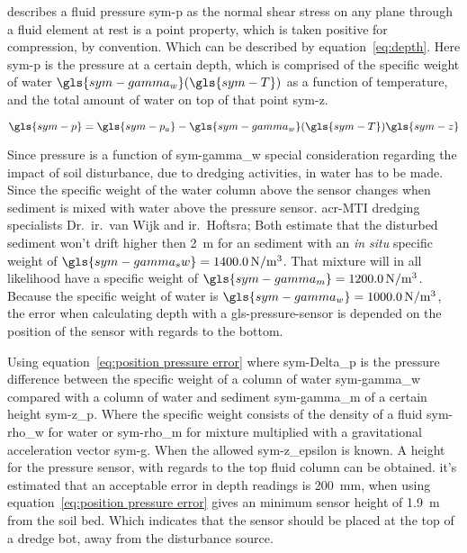 \citet{white_fluid_2011} describes a fluid pressure \gls{sym-p} as the normal shear stress on any plane through a fluid
element at rest is a point property, which is taken positive for compression, by convention. Which can be described by
equation~\ref{eq:depth}. Here \gls{sym-p} is the pressure at a certain depth, which is comprised of the specific weight
of water \( \gls{sym-gamma_w}(\gls{sym-T}) \) as a function of temperature, and the total amount of water on top of
that point \gls{sym-z}.

\begin{equation}
    \label{eq:depth}
    \gls{sym-p} = \gls{sym-p_a} - \gls{sym-gamma_w}(\gls{sym-T}) \gls{sym-z}
\end{equation}

Since pressure is a function of \gls{sym-gamma_w} special consideration regarding the impact of soil disturbance, due to
dredging activities, in water has to be made. Since the specific weight of the water column above the sensor changes
when sediment is mixed with water above the pressure sensor. \gls{acr-MTI} dredging specialists Dr.~ir.~van Wijk and
ir.~Hoftsra; Both estimate that the disturbed sediment won't drift higher then \SI{2}{\meter} for an sediment with an
\emph{in situ} specific weight of \( \gls{sym-gamma_sw} = \SI{1400}{\N\per\cubic\meter} \). That mixture will in all
likelihood have a specific weight of \( \gls{sym-gamma_m} = \SI{1200}{\N\per\cubic\meter} \). Because the specific
weight of water is \( \gls{sym-gamma_w} = \SI{1000}{\N\per\cubic\meter} \), the error when calculating depth with a
\gls{gls-pressure-sensor} is depended on the position of the sensor with regards to the bottom.

Using equation~\ref{eq:position pressure error} where \gls{sym-Delta_p} is the pressure difference between the specific
weight of a column of water \gls{sym-gamma_w} compared with a column of water and sediment  \gls{sym-gamma_m}  of a
certain height \gls{sym-z_p}. Where the specific weight consists of the density of a fluid \gls{sym-rho_w} for water or
\gls{sym-rho_m} for mixture multiplied with a gravitational acceleration vector \gls{sym-g}. When the allowed
\gls{sym-z_epsilon} is known. A height for the pressure sensor, with regards to the top fluid column can be
obtained. it's estimated that an acceptable error in depth readings is \SI{200}{\mm}, when using
equation~\ref{eq:position pressure error} gives an minimum sensor height of \SI{1.9}{\meter} from the soil bed. Which
indicates that the sensor should be placed at the top of a dredge bot, away from the disturbance source.

